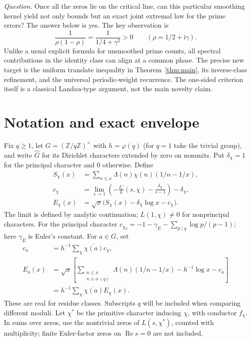 \documentclass[11pt]{article}
\theoremstyle{remark}\newtheorem{remark}[theorem]{Remark}
\newcommand{\Rea}{\operatorname{Re}}
\newcommand{\ii}{\mathrm{i}}
\begin{document}
\emph{Question.} Once all the zeros lie on the critical line, can this particular smoothing kernel yield not only bounds but an exact joint extremal law for the prime errors? The answer below is yes. The key observation is
\begin{equation}\label{eq:positive}
 \frac1{\rho(1-\rho)}=\frac1{1/4+\gamma^2}>0
 \qquad (\rho=1/2+\ii\gamma).
\end{equation}
Unlike a usual explicit formula for unsmoothed prime counts, all spectral contributions in the identity class can align at a common phase. The precise new target is the uniform translate inequality in Theorem~\ref{thm:main}, its inverse-class refinement, and the universal periodic-weight recurrence. The one-sided criterion itself is a classical Landau-type argument, not the main novelty claim.

\section{Notation and exact envelope}
Fix $q\ge1$, let $G=(\mathbb Z/q\mathbb Z)^\times$ with $h=\varphi(q)$ (for $q=1$ take the trivial group), and write $\widehat G$ for its Dirichlet characters extended by zero on nonunits. Put $\delta_\chi=1$ for the principal character and $0$ otherwise. Define
\begin{align}
 S_\chi(x)&=\sum_{n\le x}\Lambda(n)\chi(n)(1/n-1/x),\nonumber\\
 c_\chi&=\lim_{s\to1}\left(-\frac{L'}{L}(s,\chi)-\frac{\delta_\chi}{s-1}\right)-\delta_\chi,\label{eq:constant}\\
 E_\chi(x)&=\sqrt{x}\big(S_\chi(x)-\delta_\chi\log x-c_\chi\big).
\end{align}
The limit is defined by analytic continuation; $L(1,\chi)\ne0$ for nonprincipal characters. For the principal character $c_{\chi_0}=-1-\gamma_E-\sum_{p\mid q}\log p/(p-1)$; here $\gamma_E$ is Euler's constant. For $a\in G$, set
\begin{align}
 c_a&=h^{-1}\sum_\chi\overline{\chi(a)}c_\chi,\\
 E_a(x)&=\sqrt{x}\left[\sum_{\substack{n\le x\\n\equiv a\ (q)}}\Lambda(n)(1/n-1/x)
                      -h^{-1}\log x-c_a\right]\nonumber\\
 &=h^{-1}\sum_\chi\overline{\chi(a)} E_\chi(x).\label{eq:fourier}
\end{align}
These are real for residue classes. Subscripts $q$ will be included when comparing different moduli. Let $\chi^*$ be the primitive character inducing $\chi$, with conductor $f_\chi$. In sums over zeros, use the nontrivial zeros of $L(s,\chi^*)$, counted with multiplicity; finite Euler-factor zeros on $\Rea s=0$ are not included.
\end{document}
